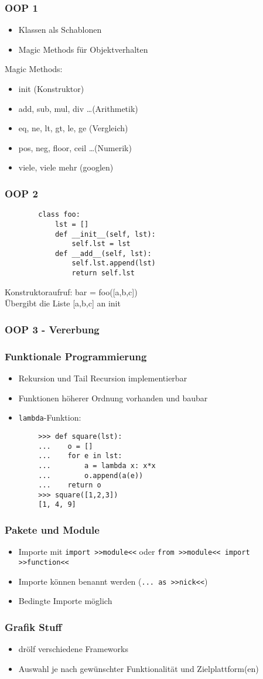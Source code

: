 \documentclass[handout]{beamer}
\begin{document}
\begin{frame}
	\frametitle{OOP 1}
	\begin{itemize}
		\item Klassen als Schablonen
		\item Magic Methods für Objektverhalten
	\end{itemize}
	Magic Methods:
	\begin{itemize}
		\item init (Konstruktor)
		\item add, sub, mul, div \dots (Arithmetik)
		\item eq, ne, lt, gt, le, ge (Vergleich)
		\item pos, neg, floor, ceil \dots (Numerik)
		\item viele, viele mehr (googlen)
	\end{itemize}
\end{frame}

\begin{frame}[fragile]
	\frametitle{OOP 2}
	\begin{lstlisting}
		class foo:
			lst = []
		    def __init__(self, lst):
		        self.lst = lst
		    def __add__(self, lst):
		        self.lst.append(lst)
		        return self.lst
	\end{lstlisting}
	Konstruktoraufruf: bar = foo([a,b,c])\\
	Übergibt die Liste [a,b,c] an init
\end{frame}

\begin{frame}[fragile]
	\frametitle{OOP 3 - Vererbung}
\end{frame}

\begin{frame}[fragile]
	\frametitle{Funktionale Programmierung}
	\begin{itemize}
		\item Rekursion und Tail Recursion implementierbar
		\item Funktionen höherer Ordnung vorhanden und baubar
		\item \texttt{lambda}-Funktion:
	\end{itemize}
	\begin{lstlisting}
		>>> def square(lst):
		...    o = []
		...    for e in lst:
		...        a = lambda x: x*x
		...        o.append(a(e))
		...    return o
		>>> square([1,2,3])
		[1, 4, 9]
	\end{lstlisting}
\end{frame}

\begin{frame}
	\frametitle{Pakete und Module}
	\begin{itemize}
		\item Importe mit \texttt{import >>module<<} oder \texttt{from >>module<< import >>function<<}
		\item Importe können benannt werden (\texttt{... as >>nick<<})
		\item Bedingte Importe möglich
	\end{itemize}
\end{frame}

\begin{frame}
	\frametitle{Grafik Stuff}
	\begin{itemize}
		\item drölf verschiedene Frameworks
		\item Auswahl je nach gewünschter Funktionalität und Zielplattform(en)
	\end{itemize}
\end{frame}
	
\end{document}

